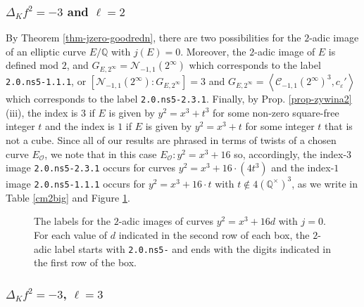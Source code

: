 \documentclass[11pt]{amsart}
\theoremstyle{definition}
\newcommand{\Q}{\mathbb Q}
\newcommand{\cC}{\mathcal{C}}
\begin{document}
\subsubsection{$\Delta_K f^2 = -3$ and $\ell=2$}\label{sec-delta3ell2} By Theorem \ref{thm-jzero-goodredn}, there are two possibilities for the $2$-adic image of an elliptic curve $E/\Q$ with $j(E)=0$. Moreover, the $2$-adic image of $E$ is defined mod $2$, and $G_{E,2^\infty} = \mathcal{N}_{-1,1}(2^\infty)$ which corresponds to the label \texttt{2.0.ns5-1.1.1}, or $[\mathcal{N}_{-1,1}(2^\infty):G_{E,2^\infty}]=3$ and $G_{E,2^\infty} =\left\langle \cC_{-1,1}(2^\infty)^3, c_{\varepsilon}' \right\rangle$ which corresponds to the label \texttt{2.0.ns5-2.3.1}. Finally, by Prop. \ref{prop-zywina2}(iii), the index is $3$ if $E$ is given by $y^2=x^3+t^3$ for some non-zero square-free integer $t$ and the index is $1$ if $E$ is given by $y^2=x^3+t$ for some integer $t$ that is not a cube. Since all of our results are phrased in terms of twists of a chosen curve $E_\mathcal{O}$, we note that in this case $E_\mathcal{O}:y^2=x^3+16$ so, accordingly, the index-$3$ image  \texttt{2.0.ns5-2.3.1} occurs for curves $y^2=x^3+16\cdot (4t^3)$ and the index-$1$ image \texttt{2.0.ns5-1.1.1} occurs for $y^2=x^3+16\cdot t$ with $t\notin 4(\Q^\times)^3$, as we write in Table \ref{cm2big} and Figure \ref{fig-3ell2}.

\begin{figure}[ht]
\caption{The labels for the $2$-adic images of curves $y^2=x^3+16d$ with $j=0$. For each value of $d$ indicated in the second row of each box, the $2$-adic label starts with \texttt{2.0.ns5-} and ends with the digits indicated in the first row of the box.}\label{fig-3ell2}
\end{figure}



\subsubsection{$\Delta_Kf^2=-3$, $\ell = 3$}\label{sec-delta3ell3}
\end{document}

